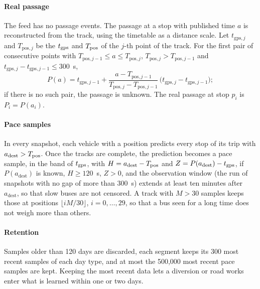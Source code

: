 \paragraph{Real passage} The feed has no passage events. The passage at a stop with published time $a$ is
reconstructed from the track, using the timetable as a distance scale. Let $t_{\mathrm{gps},j}$ and
$T_{\mathrm{pos},j}$ be the $t_{\mathrm{gps}}$ and $T_{\mathrm{pos}}$ of the $j$-th point of the track. For the first pair of consecutive
points with $T_{\mathrm{pos},j-1}\le a\le T_{\mathrm{pos},j}$, $T_{\mathrm{pos},j}>T_{\mathrm{pos},j-1}$ and
$t_{\mathrm{gps},j}-t_{\mathrm{gps},j-1}\le300$~s,
\begin{equation}
P(a)=t_{\mathrm{gps},j-1}+\frac{a-T_{\mathrm{pos},j-1}}{T_{\mathrm{pos},j}-T_{\mathrm{pos},j-1}}\,
\big(t_{\mathrm{gps},j}-t_{\mathrm{gps},j-1}\big);
\label{eq:passage}
\end{equation}
if there is no such pair, the passage is unknown. The real passage at stop $p_i$ is $P_i=P(a_i)$.

\paragraph{Pace samples} In every snapshot, each vehicle with a position predicts every stop of its trip with
$a_{\mathrm{dest}}>T_{\mathrm{pos}}$. Once the tracks are complete, the prediction becomes a pace sample, in the band of $t_{\mathrm{gps}}$,
with $H=a_{\mathrm{dest}}-T_{\mathrm{pos}}$ and $Z=P(a_{\mathrm{dest}})-t_{\mathrm{gps}}$, if $P(a_{\mathrm{dest}})$ is known, $H\ge120$~s,
$Z>0$, and the observation window (the run of snapshots with no gap of more than 300~s) extends at least ten minutes
after $a_{\mathrm{dest}}$, so that slow buses are not censored. A track with $M>30$ samples keeps those at positions
$\lfloor iM/30\rfloor$, $i=0,\dots,29$, so that a bus seen for a long time does not weigh more than others.

\paragraph{Retention} Samples older than 120 days are discarded, each segment keeps its 300 most recent samples of each
day type, and at most the 500,000 most recent pace samples are kept. Keeping the most recent data lets a diversion or
road works enter what is learned within one or two days.

